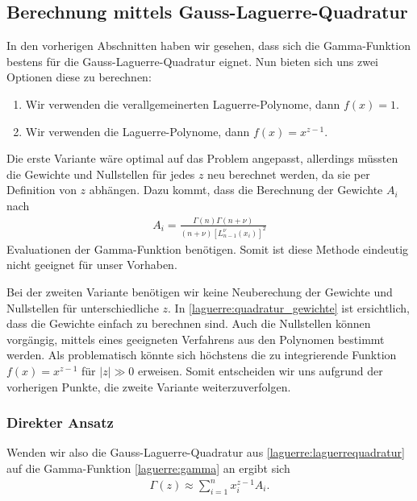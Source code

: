 \subsection{Berechnung mittels Gauss-Laguerre-Quadratur}
In den vorherigen Abschnitten haben wir gesehen,
dass sich die Gamma-Funktion bestens für die Gauss-Laguerre-Quadratur eignet.
Nun bieten sich uns zwei Optionen diese zu berechnen:
\begin{enumerate}
\item Wir verwenden die verallgemeinerten Laguerre-Polynome, dann $f(x)=1$.
\item Wir verwenden die Laguerre-Polynome, dann $f(x)=x^{z-1}$.
\end{enumerate}
Die erste Variante wäre optimal auf das Problem angepasst,
allerdings müssten die Gewichte und Nullstellen für jedes $z$
neu berechnet werden,
da sie per Definition von $z$ abhängen.
Dazu kommt,
dass die Berechnung der Gewichte $A_i$ nach \cite{laguerre:Cassity1965AbcissasCA}
\begin{align*}
A_i
=
\frac{
\Gamma(n) \Gamma(n+\nu)
}
{
(n+\nu)
\left[L_{n-1}^{\nu}(x_i)\right]^2
}
\end{align*}
Evaluationen der Gamma-Funktion benötigen.
Somit ist diese Methode eindeutig nicht geeignet für unser Vorhaben.

Bei der zweiten Variante benötigen wir keine Neuberechung der Gewichte
und Nullstellen für unterschiedliche $z$.
In \eqref{laguerre:quadratur_gewichte} ist ersichtlich,
dass die Gewichte einfach zu berechnen sind.
Auch die Nullstellen können vorgängig,
mittels eines geeigneten Verfahrens aus den Polynomen bestimmt werden.
Als problematisch könnte sich höchstens
die zu integrierende Funktion $f(x)=x^{z-1}$ für $|z| \gg 0$ erweisen.
Somit entscheiden wir uns aufgrund der vorherigen Punkte,
die zweite Variante weiterzuverfolgen.

\subsubsection{Direkter Ansatz}
Wenden wir also die Gauss-Laguerre-Quadratur aus
\eqref{laguerre:laguerrequadratur} auf die Gamma-Funktion
\eqref{laguerre:gamma} an ergibt sich
\begin{align}
\Gamma(z)
\approx
\sum_{i=1}^n x_i^{z-1} A_i.
\label{laguerre:naive_lag}
\end{align}


